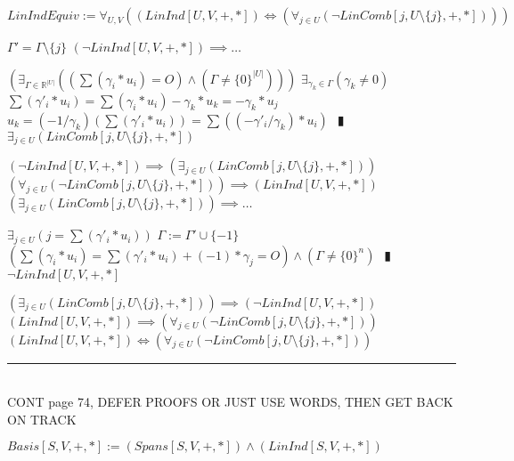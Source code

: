 \documentclass{book}
\newcommand{\abr}{:=}
\newcommand{\pipe}{$\phantom{(}\vrectangleblack\phantom{)}$}
\begin{document}
$LinIndEquiv \abr \forall_{U, V}((LinInd[U, V, +, *]) \iff (\forall_{j \in U}(\lnot LinComb[j, U \setminus \{j\}, +, *])))$
\begin{enumerate}
  \lit $\Gamma' = \Gamma \setminus \{j\}$
  \lit $(\lnot LinInd[U, V, +, *]) \implies \ldots$
  \begin{enumerate}
    \lit $(\exists_{\Gamma \in \mathbb{R}^|U|}((\sum(\gamma_i * u_i) = O) \land (\Gamma \neq \{0\}^{|U|})))$
    \lit $\exists_{\gamma_k \in \Gamma}(\gamma_k \neq 0)$
    \lit $\sum(\gamma'_i * u_i) = \sum(\gamma_i * u_i) - \gamma_k * u_k = -\gamma_k * u_j$
    \lit $u_k = (-1 / \gamma_k)(\sum(\gamma'_i * u_i)) = \sum( (-\gamma'_i / \gamma_k) * u_i)$ \pipe $\exists_{j \in U}(LinComb[j, U \setminus \{j\}, +, *])$
   \end{enumerate}
  \lit $(\lnot LinInd[U, V, +, *]) \implies (\exists_{j \in U}(LinComb[j, U \setminus \{j\}, +, *]))$
  \lit $(\forall_{j \in U}(\lnot LinComb[j, U \setminus \{j\}, +, *])) \implies (LinInd[U, V, +, *])$
  \lit $(\exists_{j \in U}(LinComb[j, U \setminus \{j\}, +, *])) \implies \ldots$
  \begin{enumerate}
    \lit $\exists_{j \in U}(j = \sum(\gamma'_i * u_i))$
    \lit $\Gamma \abr \Gamma' \cup \{-1\}$
    \lit $(\sum(\gamma_i * u_i) = \sum(\gamma'_i * u_i) + (-1) * \gamma_j = O) \land (\Gamma \neq \{0\}^n)$ \pipe $\lnot LinInd[U, V, +, *]$
  \end{enumerate}
  \lit $(\exists_{j \in U}(LinComb[j, U \setminus \{j\}, +, *])) \implies (\lnot LinInd[U, V, +, *])$
  \lit $(LinInd[U, V, +, *]) \implies (\forall_{j \in U}(\lnot LinComb[j, U \setminus \{j\}, +, *]))$
  \lit $(LinInd[U, V, +, *]) \iff (\forall_{j \in U}(\lnot LinComb[j, U \setminus \{j\}, +, *]))$
\end{enumerate} \vspace{.75mm} \hrule \vspace{.75mm} \ \\ 

CONT page 74, DEFER PROOFS OR JUST USE WORDS, THEN GET BACK ON TRACK






$Basis[S, V, +, *] \abr (Spans[S, V, +, *]) \land (LinInd[S, V, +, *])$ \\
\end{document}
